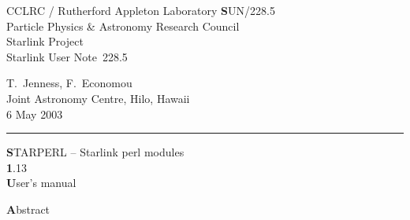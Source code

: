\documentclass[twoside,11pt]{article}
\newcommand{\stardoccategory}  {Starlink User Note}
\newcommand{\stardocinitials}  {SUN}
\newcommand{\stardocnumber}    {228.5}
\newcommand{\stardocauthors}   {T.\ Jenness, F.\ Economou\\
                                Joint Astronomy Centre, Hilo, Hawaii}
\newcommand{\stardocdate}      {6 May 2003}
\newcommand{\stardoctitle}     {STARPERL -- Starlink perl modules}
\newcommand{\stardocversion}   {1.13}
\newcommand{\stardocmanual}    {User's manual}
\newcommand{\stardocname}{\stardocinitials /\stardocnumber}
\newenvironment{latexonly}{}{}
\renewcommand{\_}{\texttt{\symbol{95}}}
\begin{document}
\thispagestyle{empty}

\begin{latexonly}
  CCLRC / {\textsc Rutherford Appleton Laboratory} \hfill {\textbf \stardocname}\\
   {\large Particle Physics \& Astronomy Research Council}\\
   {\large Starlink Project\\}
   {\large \stardoccategory\ \stardocnumber}
   \begin{flushright}
   \stardocauthors\\
   \stardocdate
   \end{flushright}
   \vspace{-4mm}
   \rule{\textwidth}{0.5mm}
   \vspace{5mm}
   \begin{center}
   {\Huge\textbf  \stardoctitle \\ [2.5ex]}
   {\LARGE\textbf \stardocversion \\ [4ex]}
   {\Huge\textbf  \stardocmanual}
   \end{center}
   \vspace{5mm}


   \vspace{10mm}
   \begin{center}
      {\Large\textbf Abstract}
   \end{center}
\end{latexonly}
\end{document}
